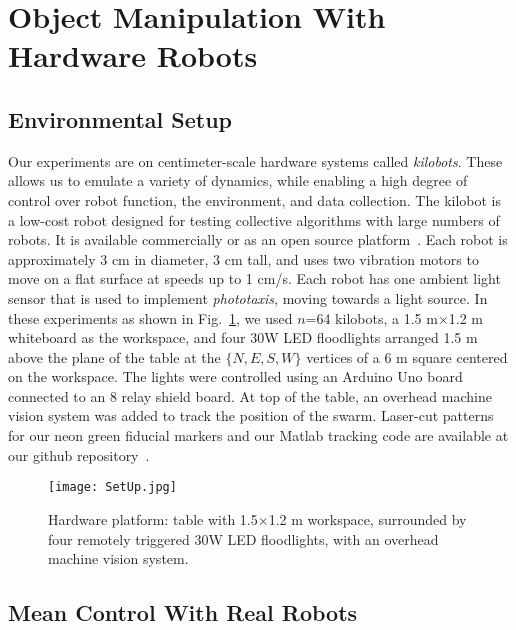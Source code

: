 
\section{Object Manipulation With Hardware Robots}\label{sec:realExperiment}

  
\subsection{Environmental Setup}
Our experiments are on centimeter-scale hardware systems called \emph{kilobots}.  These allows us to emulate a variety of dynamics, while enabling a high degree of control over robot function, the environment, and data collection. The kilobot \cite{Rubenstein2012,rubenstein2014programmable} is a low-cost robot designed for testing collective algorithms with large numbers of robots. It is available commercially or as an open source platform~\cite{K-Team2015}.  Each robot is approximately 3 cm in diameter, 3 cm tall, and uses two vibration motors to move on a flat surface at speeds up to 1 cm/s.  Each robot has one ambient light sensor that is used to implement \emph{phototaxis},  moving towards a light source. 
In these experiments as shown in Fig.~\ref{fig:setup}, we used $n$=64 kilobots, a 1.5 m$\times$1.2 m whiteboard as the workspace, and four 30W LED floodlights arranged 1.5 m above the plane of the table at the $\{N,E,S,W\}$ vertices of a 6 m square centered on the workspace. The lights were controlled using an Arduino Uno board connected to an 8 relay shield board.  At top of the table, an overhead machine vision system was added to track the position of the swarm. Laser-cut patterns for our neon green fiducial markers and our {\sc Matlab} tracking code are available at our github repository~\cite{Shahrokhi2015GitHubShapeControl}.
\begin{figure}
\begin{center}
	\texttt{[image: SetUp.jpg]}
\end{center}
\caption{\label{fig:setup}
Hardware platform:  table with 1.5$\times$1.2 m workspace, surrounded by four remotely triggered 30W LED floodlights, with an overhead machine vision system.
}
\end{figure}
\subsection{Mean Control With Real Robots}


